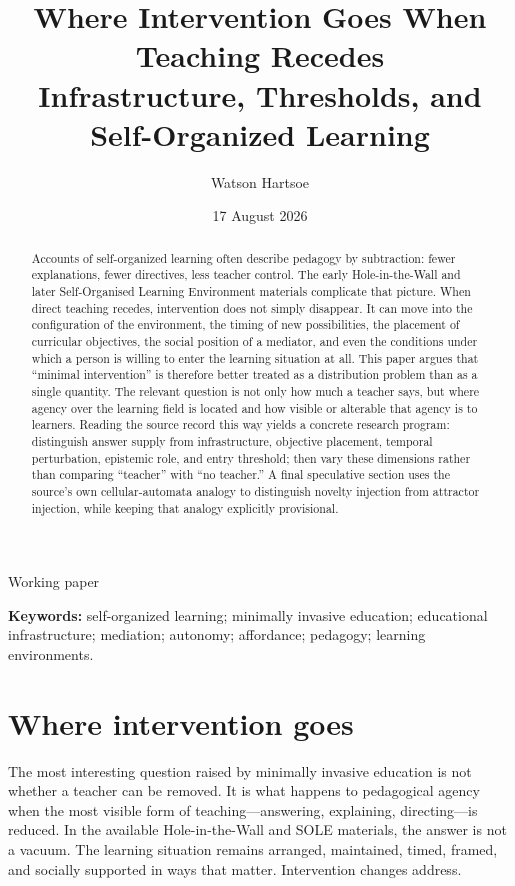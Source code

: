 \documentclass[11pt]{article}
\title{\textbf{Where Intervention Goes When Teaching Recedes}\\[0.35em]
\large Infrastructure, Thresholds, and Self-Organized Learning}
\author{Watson Hartsoe}
\date{17 August 2026}
\begin{document}
\maketitle
\begin{center}
{\small\color{quietgray}Working paper}
\end{center}
\vspace{0.5em}

\begin{abstract}
Accounts of self-organized learning often describe pedagogy by subtraction: fewer explanations, fewer directives, less teacher control. The early Hole-in-the-Wall and later Self-Organised Learning Environment materials complicate that picture. When direct teaching recedes, intervention does not simply disappear. It can move into the configuration of the environment, the timing of new possibilities, the placement of curricular objectives, the social position of a mediator, and even the conditions under which a person is willing to enter the learning situation at all. This paper argues that ``minimal intervention'' is therefore better treated as a distribution problem than as a single quantity. The relevant question is not only how much a teacher says, but where agency over the learning field is located and how visible or alterable that agency is to learners. Reading the source record this way yields a concrete research program: distinguish answer supply from infrastructure, objective placement, temporal perturbation, epistemic role, and entry threshold; then vary these dimensions rather than comparing ``teacher'' with ``no teacher.'' A final speculative section uses the source's own cellular-automata analogy to distinguish novelty injection from attractor injection, while keeping that analogy explicitly provisional.
\end{abstract}

\noindent\textbf{Keywords:} self-organized learning; minimally invasive education; educational infrastructure; mediation; autonomy; affordance; pedagogy; learning environments.

\section{Where intervention goes}
The most interesting question raised by minimally invasive education is not whether a teacher can be removed. It is what happens to pedagogical agency when the most visible form of teaching---answering, explaining, directing---is reduced. In the available Hole-in-the-Wall and SOLE materials, the answer is not a vacuum. The learning situation remains arranged, maintained, timed, framed, and socially supported in ways that matter. Intervention changes address.
\end{document}
